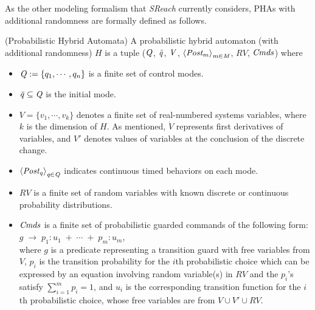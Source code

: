 \vspace{-.4cm}
As the other modeling formalism that {\it SReach} currently considers, PHAs with additional randomness are formally defined as follows.
\vspace{-.4cm}
\begin{definition}
\label{def:pha}
{\rm(Probabilistic Hybrid Automata)} A probabilistic hybrid automaton  (with additional randomness) $H$ is a tuple (${\it Q}$, ${\it \bar{q}}$, ${\it V}$, ${\it \left \langle Post_m \right \rangle_{m \in M}}$, $RV$, ${\it Cmds}$) where
\vspace{-.4cm}
\begin{itemize}
\item ${\it Q} := \{ q_1, \cdots, q_n \}$ is a finite set of control modes.
\vspace{-.2cm}
\item ${\it \bar{q}} \subseteq {\it Q}$ is the initial mode.
\vspace{-.2cm}
\item $V = \{ v_1, \cdots, v_k \}$ denotes a finite set of real-numbered systems variables, where $k$ is the dimension of $H$. As mentioned, $\dot{V}$ represents first derivatives of variables, and $V'$ denotes values of variables at the conclusion of the discrete change.
\vspace{-.2cm}
\item ${\it \left \langle Post_q \right \rangle_{q \in Q}}$ indicates continuous timed behaviors on each mode. 
\vspace{-.2cm}
\item $RV$ is a finite set of random variables with known discrete or continuous probability distributions.
\vspace{-.2cm}
\item ${\it Cmds}$ is a finite set of probabilistic guarded commands of the following form: \\
$g \; \rightarrow \; p_1:u_1 \; + \; \cdots \; + \; p_m:u_m$,\\
where $g$ is a predicate representing a transition guard with free variables from $V$, $p_i$ is the transition probability for the $i$th probabilistic choice which can be expressed by an equation involving random variable(s) in $RV$ 
and the $p_i$'s satisfy $\sum_{i=1}^m p_i =1$, and $u_i$ is the corresponding transition function for the $i$th probabilistic choice, whose free variables are from $V \cup V' \cup RV$.
\end{itemize}
\end{definition}
